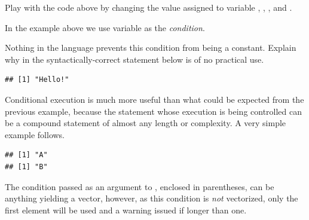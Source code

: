 \documentclass[krantz2]{krantz}\usepackage{knitr}
\begin{document}
\begin{playground}
Play with the code above by changing the value assigned to variable , , , and .

In the example above we use variable  as the \emph{condition}.

Nothing in the \Rlang language prevents this condition from being a  constant. Explain why  in the syntactically-correct statement below is of no practical use.

\begin{knitrout}\footnotesize
{}\color{fgcolor}\begin{kframe}
\begin{alltt}
 \hlstd{(}\hlstd{)} \hlstd{(}\hlstd{)}
\end{alltt}
\begin{verbatim}
## [1] "Hello!"
\end{verbatim}
\end{kframe}
\end{knitrout}
\end{playground}

Conditional execution is much more useful than what could be expected from the previous example, because the statement whose execution is being controlled can be a compound statement of almost any length or complexity. A very simple example follows.

\begin{knitrout}\footnotesize
{}\color{fgcolor}\begin{kframe}
\begin{alltt}
 \hlkwb{<-} 
 
  \hlstd{(}\hlstd{)}
  \hlstd{(}\hlstd{)}
\hlstd{\}}
\end{alltt}
\begin{verbatim}
## [1] "A"
## [1] "B"
\end{verbatim}
\end{kframe}
\end{knitrout}

The condition passed as an argument to , enclosed in parentheses, can be anything yielding a  vector, however, as this condition is \emph{not} vectorized, only the first element will be used and a warning issued if longer than one.
\end{document}
